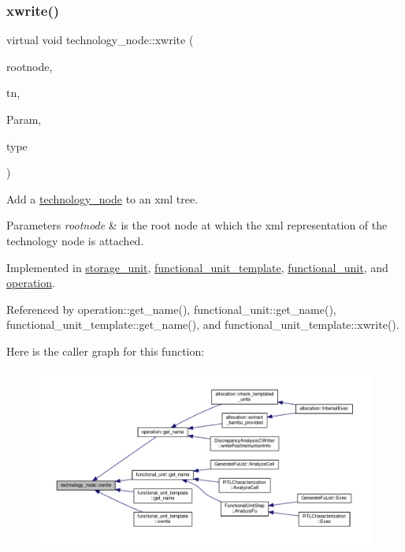 \subsubsection{\texorpdfstring{xwrite()}{xwrite()}}
{\footnotesize\ttfamily virtual void technology\+\_\+node\+::xwrite (\begin{DoxyParamCaption}\item[{\hyperlink{classxml__element}{xml\+\_\+element} $\ast$}]{rootnode,  }\item[{const \hyperlink{technology__node_8hpp_a33dd193b7bd6b987bf0d8a770a819fa7}{technology\+\_\+node\+Ref}}]{tn,  }\item[{const \hyperlink{Parameter_8hpp_a37841774a6fcb479b597fdf8955eb4ea}{Parameter\+Const\+Ref}}]{Param,  }\item[{\hyperlink{target__device_8hpp_a476becc690220f0805ce73006449c732}{Target\+Device\+\_\+\+Type}}]{type }\end{DoxyParamCaption})\hspace{0.3cm}{\ttfamily [pure virtual]}}



Add a \hyperlink{structtechnology__node}{technology\+\_\+node} to an xml tree. 


\begin{DoxyParams}{Parameters}
{\em rootnode} & is the root node at which the xml representation of the technology node is attached. \\
\hline
\end{DoxyParams}


Implemented in \hyperlink{structstorage__unit_ae685e07bc1e5d1c8f7a18f2ddf646dc9}{storage\+\_\+unit}, \hyperlink{structfunctional__unit__template_a3665d165eb3d912e2c46bf9e57006a40}{functional\+\_\+unit\+\_\+template}, \hyperlink{structfunctional__unit_a49837b741da6b92962511fc1d3d20ff0}{functional\+\_\+unit}, and \hyperlink{structoperation_a5edb965df8d7b05e912feabfbfe1306b}{operation}.



Referenced by operation\+::get\+\_\+name(), functional\+\_\+unit\+::get\+\_\+name(), functional\+\_\+unit\+\_\+template\+::get\+\_\+name(), and functional\+\_\+unit\+\_\+template\+::xwrite().

Here is the caller graph for this function\+:
\nopagebreak
\begin{figure}[H]
\begin{center}
\leavevmode
\includegraphics[width=350pt]{df/d06/structtechnology__node_a8ce6644a0b2700f760936e4c02754e2f_icgraph}
\end{center}
\end{figure}


